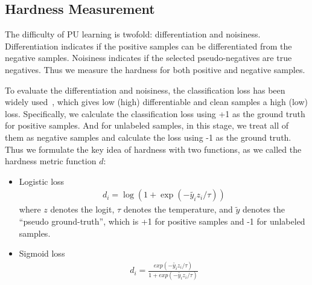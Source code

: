 \documentclass[sigconf]{acmart}
\begin{document}

\subsection{Hardness Measurement}

The difficulty of PU learning is twofold: differentiation and noisiness. Differentiation indicates if the positive samples can be differentiated from the negative samples. Noisiness indicates if the selected pseudo-negatives are true negatives. Thus we measure the hardness for both positive and negative samples.

To evaluate the differentiation and noisiness, the classification loss has been widely used~\cite{xu2019revisiting}, which gives low (high) differentiable and clean samples a high (low) loss. Specifically, we calculate the classification loss using +1 as the ground truth for positive samples. And for unlabeled samples, in this stage, we treat all of them as negative samples and calculate the loss using -1 as the ground truth. Thus we formulate the key idea of hardness with two functions, as we called the hardness metric function $d$:

\begin{itemize}
    \item Logistic loss
\begin{align}
    d_i = \log(1+\exp(-\tilde{y_i}z_i/\tau))\label{eq:log}
\end{align}
where $z$ denotes the logit, $\tau$ denotes the temperature, and $\tilde{y}$ denotes the ``pseudo ground-truth'', which is +1 for positive samples and -1 for unlabeled samples.
\item Sigmoid loss 
\begin{align}
    d_i = \frac{exp(-\tilde{y_i}z_i/\tau)}{1+exp(-\tilde{y_i}z_i/\tau)}\label{eq:sig}
\end{align}
\end{itemize}


\end{document}
